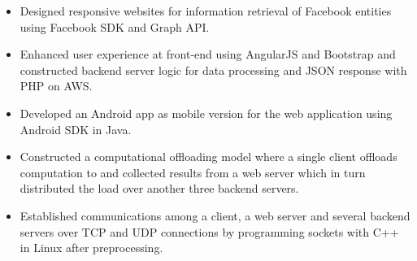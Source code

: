 {
	{\begin{itemize}
		\item Designed responsive websites for information retrieval of Facebook entities using Facebook SDK and Graph API.
		\item Enhanced user experience at front-end using AngularJS and Bootstrap and constructed backend server logic for data processing and JSON response with PHP on AWS.
		\item Developed an Android app as mobile version for the web application using Android SDK in Java.
  	\end{itemize}
  }
}

{
	{\begin{itemize}
		\item Constructed a computational offloading model where a single client offloads computation to and collected results from a web server which in turn distributed the load over another three backend servers.
		\item Established communications among a client, a web server and several backend servers over TCP and UDP connections by programming sockets with C++ in Linux after preprocessing.
  	\end{itemize}
  }
}
